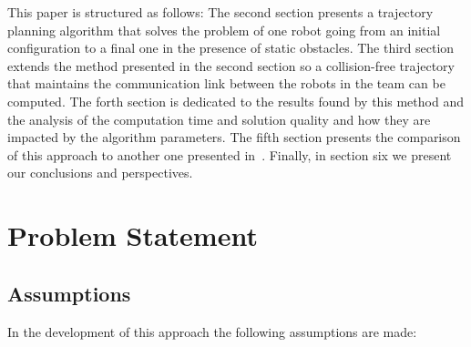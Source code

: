 \documentclass[eprint]{actapoly}
\begin{document}
 


This paper is structured as follows: The second section presents a trajectory 
planning algorithm that solves the problem of one robot going from an initial 
configuration to a final one in the presence of static obstacles. The third 
section extends the method presented in the second section so a collision-free 
trajectory that maintains the communication link between the robots in the 
team can be computed. The forth section is dedicated to the results found by 
this method and the analysis of the computation time and solution quality and 
how they are impacted by the algorithm parameters. The fifth section presents 
the comparison of this approach to another one presented in~\cite{}. Finally, in 
section six we present our conclusions and perspectives.


\section{Problem Statement}\label{sec:problem}

\subsection{Assumptions}
In the development of this approach the following assumptions are made:
\end{document}
